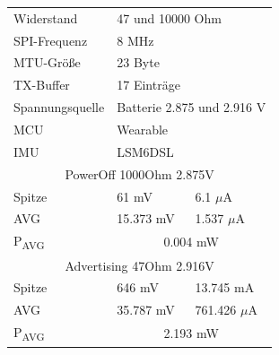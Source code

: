 \begin{figure}[!hbtp]
\begin{minipage}{0.5\textwidth}
\begin{tabular}{|l|l|l|}
      \hline
    \end{tabular}
    \label{tab:test5}
  \end{minipage}
  \begin{minipage}{0.5\textwidth}
    \centering
    \begin{tabular}{|l|l|l|}
      \hline
      Widerstand & \multicolumn{2}{l|}{47 und 10000 Ohm}\\
      SPI-Frequenz & \multicolumn{2}{l|}{8 MHz}\\
      MTU-Größe & \multicolumn{2}{l|}{23 Byte}\\
      TX-Buffer & \multicolumn{2}{l|}{17 Einträge}\\
      Spannungsquelle & \multicolumn{2}{l|}{Batterie 2.875 und 2.916 V}\\
      MCU & \multicolumn{2}{l|}{Wearable}\\
      IMU & \multicolumn{2}{l|}{LSM6DSL}\\
      \hline
      \multicolumn{3}{|c|}{PowerOff 1000Ohm 2.875V}\\
      Spitze & 61 mV & 6.1 $\mu$A\\
      AVG & 15.373 mV & 1.537 $\mu$A\\
      P\textsubscript{AVG} & \multicolumn{2}{c|}{0.004 mW}\\
      \hline
      \multicolumn{3}{|c|}{Advertising 47Ohm 2.916V}\\
      Spitze & 646 mV & 13.745 mA\\
      AVG & 35.787 mV & 761.426 $\mu$A\\
      P\textsubscript{AVG} & \multicolumn{2}{c|}{2.193 mW}\\
      \hline
    \end{tabular}
    \label{tab:test6}
  \end{minipage}
\end{figure}

